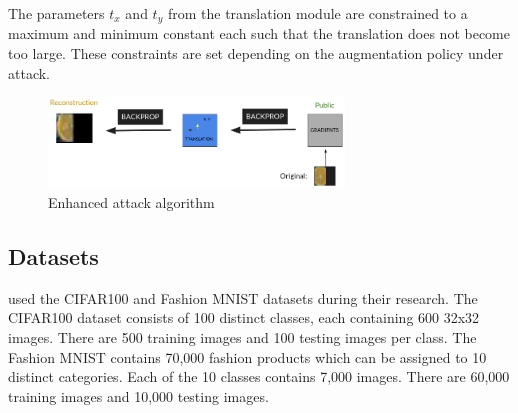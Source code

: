 The parameters $t_x$ and $t_y$ from the translation module are constrained to a maximum and minimum constant each such that the translation does not become too large. These constraints are set depending on the augmentation policy under attack.

\begin{figure}
    \centering
    \includegraphics[width = 0.7\textwidth]{enhfig2.png}
    \caption{Enhanced attack algorithm}
    \label{fig:enhfg}
\end{figure}



\subsection{Datasets}
\citeauthor{gao2021privacy} used the CIFAR100 \cite{unknown-author-2009} and Fashion MNIST \cite{xiao2017fashionmnist} datasets during their research. The CIFAR100 dataset consists of 100 distinct classes, each containing 600 32x32 images. There are 500 training images and 100 testing images per class. The Fashion MNIST contains 70,000 fashion products which can be assigned to 10 distinct categories. Each of the 10 classes contains 7,000 images. There are 60,000 training images and 10,000 testing images.


